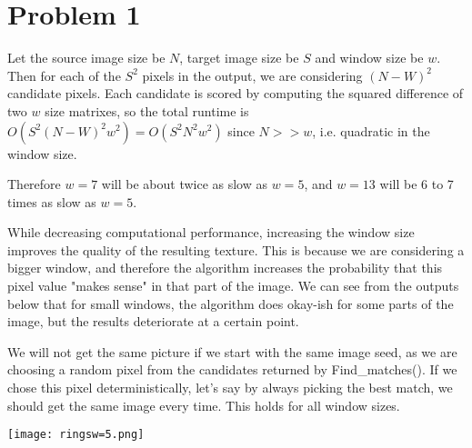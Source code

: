 \documentclass[12pt]{article}
\begin{document}
\section*{Problem 1} 

Let the source image size be $N$, target image size be $S$ and window size be $w$. Then for each of the $S^2$ pixels in the output, we are considering $(N-W)^2$ candidate pixels. Each candidate is scored by computing the squared difference of two $w$ size matrixes, so the total runtime is $O(S^2 (N-W)^2 w^2) = O(S^2N^2w^2)$ since $N >> w$, i.e. quadratic in the window size.

Therefore $w=7$ will be about twice as slow as $w=5$, and $w=13$ will be 6 to 7 times as slow as $w=5$.

While decreasing computational performance, increasing the window size improves the quality of the resulting texture. This is because we are considering a bigger window, and therefore the algorithm increases the probability that this pixel value "makes sense" in that part of the image. We can see from the outputs below that for small windows, the algorithm does okay-ish for some parts of the image, but the results deteriorate at a certain point.

We will not get the same picture if we start with the same image seed, as we are choosing a random pixel from the candidates returned by Find\_matches(). If we chose this pixel deterministically, let's say by always picking the best match, we should get the same image every time. This holds for all window sizes.


\texttt{[image: ringsw=5.png]}


 
\end{document}
